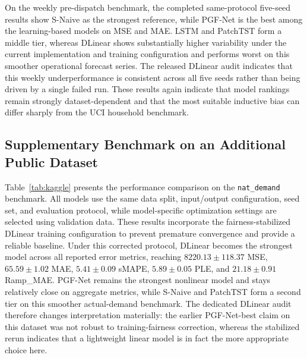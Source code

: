 \documentclass[pdflatex,sn-mathphys-num]{sn-jnl}
\theoremstyle{thmstyleone}
\theoremstyle{thmstyletwo}
\theoremstyle{thmstylethree}
\begin{document}
On the weekly pre-dispatch benchmark, the completed same-protocol five-seed results show S-Naive as the strongest reference, while PGF-Net is the best among the learning-based models on MSE and MAE. LSTM and PatchTST form a middle tier, whereas DLinear shows substantially higher variability under the current implementation and training configuration and performs worst on this smoother operational forecast series. The released DLinear audit indicates that this weekly underperformance is consistent across all five seeds rather than being driven by a single failed run. These results again indicate that model rankings remain strongly dataset-dependent and that the most suitable inductive bias can differ sharply from the UCI household benchmark.\cite{hong2016probabilistic}

\subsection{Supplementary Benchmark on an Additional Public Dataset}

Table~\ref{tab:kaggle} presents the performance comparison on the \texttt{nat\_demand} benchmark. All models use the same data split, input/output configuration, seed set, and evaluation protocol, while model-specific optimization settings are selected using validation data. These results incorporate the fairness-stabilized DLinear training configuration to prevent premature convergence and provide a reliable baseline. Under this corrected protocol, DLinear becomes the strongest model across all reported error metrics, reaching $8220.13\pm118.37$ MSE, $65.59\pm1.02$ MAE, $5.41\pm0.09$ sMAPE, $5.89\pm0.05$ PLE, and $21.18\pm0.91$ Ramp\_MAE. PGF-Net remains the strongest nonlinear model and stays relatively close on aggregate metrics, while S-Naive and PatchTST form a second tier on this smoother actual-demand benchmark. The dedicated DLinear audit therefore changes interpretation materially: the earlier PGF-Net-best claim on this dataset was not robust to training-fairness correction, whereas the stabilized rerun indicates that a lightweight linear model is in fact the more appropriate choice here.
\end{document}
